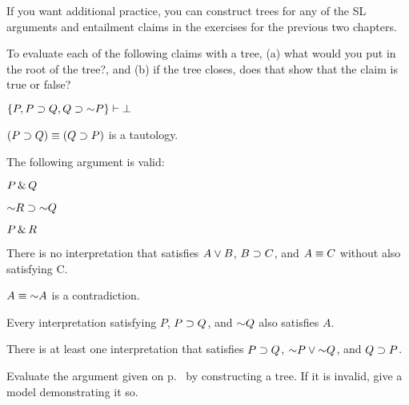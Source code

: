 



\vspace{-2em}

If you want additional practice, you can construct trees for any of the SL arguments and entailment claims in the exercises for the previous two chapters.

\solutions
\problempart 
\label{pr.sl.treeroot}
To evaluate each of the following claims with a tree, (a) what would you put in the root of the tree?, and (b) if the tree closes, does that show that the claim is true or false?
\begin{earg}
\item $\{P, P \eif Q, Q \eif \enot P\} \vdash{}\bot$
\item $(P \supset Q) \equiv (Q \supset P)$ is a tautology.
\item The following argument is valid:
	\begin{ekey}
		\item[] $P \,\&\, Q$
		\item[] $\enot R \eif \enot Q$
		\item[\therefore] $P \,\&\, R$
	\end{ekey}
\item There is no interpretation that satisfies $A \vee B$, $B \supset C$, and $A \equiv C$ without also satisfying C.
\item $A \eiff \enot A$ is a contradiction.
\item Every interpretation satisfying $P$, $P \supset Q$, and $\enot Q$ also satisfies $A$.
\item There is at least one interpretation that satisfies $P \supset Q$, $\enot P \eor \enot Q$, and $Q \supset P$.
 \end{earg}

\solutions
\problempart 
\label{pr.sl.agtree}
Evaluate the argument given on p.\ \pageref{8letterargument} by constructing a tree. If it is invalid, give a model demonstrating it so.

